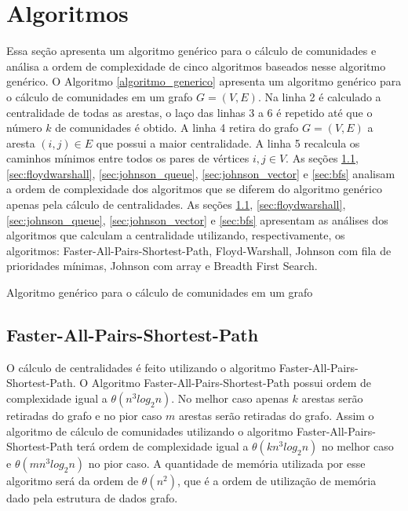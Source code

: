 \section{Algoritmos}\label{sec:algoritmos} 
Essa seção apresenta um algoritmo genérico para o cálculo de comunidades e análisa a ordem de complexidade de cinco algoritmos baseados nesse algoritmo genérico.
O Algoritmo \ref{algoritmo_generico} apresenta um algoritmo genérico para o cálculo de comunidades em um grafo $G = (V, E)$.
Na linha 2 é calculado a centralidade de todas as arestas, o laço das linhas 3 a 6 é repetido até que o número $k$ de comunidades
é obtido. A linha 4 retira do grafo $G = (V, E)$ a aresta $(i, j) \in E$ que possui a maior centralidade. A linha 5 recalcula os
caminhos mínimos entre todos os pares de vértices $i, j \in V$.
As seções \ref{sec:faster}, \ref{sec:floydwarshall}, \ref{sec:johnson_queue}, \ref{sec:johnson_vector} e \ref{sec:bfs} 
analisam a ordem de complexidade dos algoritmos que se diferem do algoritmo genérico apenas pela cálculo de centralidades. As seções 
\ref{sec:faster}, \ref{sec:floydwarshall}, \ref{sec:johnson_queue}, \ref{sec:johnson_vector} e \ref{sec:bfs} 
apresentam as análises dos algoritmos que calculam a centralidade utilizando, respectivamente, os algoritmos: Faster-All-Pairs-Shortest-Path\cite{cormen3ndFaster}, Floyd-Warshall\cite{cormen3ndFloydwarshall}, Johnson com fila de prioridades mínimas\cite{cormen3ndjohnson}, Johnson com array\cite{cormen3ndjohnson} e Breadth First Search\cite{cormen3ndbfs}.

\begin{algorithm}
\caption{Algoritmo genérico para o cálculo de comunidades em um grafo}
\label{algoritmo_generico}
\end{algorithm}

\subsection{Faster-All-Pairs-Shortest-Path}\label{sec:faster}
O cálculo de centralidades é feito utilizando o algoritmo Faster-All-Pairs-Shortest-Path. O Algoritmo Faster-All-Pairs-Shortest-Path
possui ordem de complexidade igual a $\theta(n^3log_2n)$. No melhor caso apenas $k$ arestas serão retiradas do grafo e no pior
caso $m$ arestas serão retiradas do grafo. Assim o algoritmo de cálculo de comunidades utilizando o algoritmo Faster-All-Pairs-Shortest-Path terá ordem de complexidade igual a $\theta(kn^3log_2n)$ no melhor caso e $\theta(mn^3log_2n)$ no pior caso. A quantidade
de memória utilizada por esse algoritmo será da ordem de $\theta(n^2)$, que é a ordem de utilização de memória dado pela estrutura
de dados grafo.

